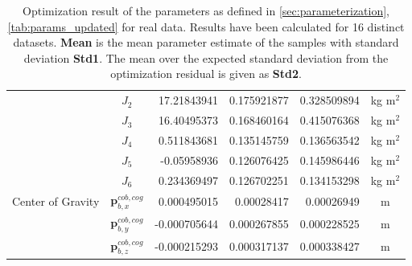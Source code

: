\begin{table}[H]
\begin{tabular}{lcrrrc}
               & $J_2$ & 17.21843941 & 0.175921877 & 0.328509894 & kg m$^2$ \\
               & $J_3$ & 16.40495373 & 0.168460164 & 0.415076368 & kg m$^2$ \\
               & $J_4$ & 0.511843681 & 0.135145759 & 0.136563542 & kg m$^2$ \\
               & $J_5$ & -0.05958936 & 0.126076425 & 0.145986446 & kg m$^2$ \\
               & $J_6$ & 0.234369497 & 0.126702251 & 0.134153298 & kg m$^2$ \\
\hline
Center of Gravity & $\mathbf{p}_{b,x}^{cob,cog}$ & 0.000495015 & 0.00028417 & 0.00026949 & m \\
                  & $\mathbf{p}_{b,y}^{cob,cog}$ & -0.000705644 & 0.000267855 & 0.000228525 & m \\
                  & $\mathbf{p}_{b,z}^{cob,cog}$ & -0.000215293 & 0.000317137 & 0.000338427 & m \\
\hline
\end{tabular}
\caption{Optimization result of the parameters as defined in \cref{sec:parameterization}, \cref{tab:params_updated} for real data. Results have been calculated for 16 distinct datasets. \textbf{Mean} is the mean parameter estimate of the samples with standard deviation \textbf{Std1}. The mean over the expected standard deviation from the optimization residual is given as \textbf{Std2}. }
\end{table}
